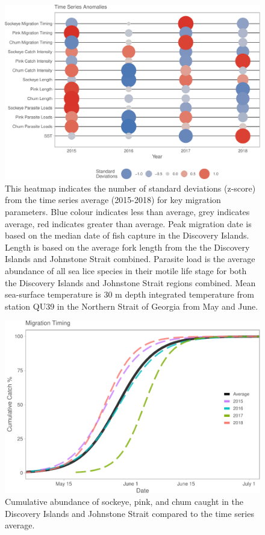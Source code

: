 \documentclass[fleqn,10pt]{wlpeerj} %
\begin{document}
\begin{figure}[H]
\includegraphics[width=0.95\linewidth]{Migration_Observations_Report_files/figure-latex/heatmap-1} \caption{This heatmap indicates the number of standard deviations (z-score) from the time series average (2015-2018) for key migration parameters. Blue colour indicates less than average, grey indicates average, red indicates greater than average. Peak migration date is based on the median date of fish capture in the Discovery Islands. Length is based on the average fork length from the the Discovery Islands and Johnstone Strait combined. Parasite load is the average abundance of all sea lice species in their motile life stage for both the Discovery Islands and Johnstone Strait regions combined. Mean sea-surface temperature is 30 m depth integrated temperature from station QU39 in the Northern Strait of Georgia from May and June.}\label{fig:heatmap}
\end{figure}

\begin{figure}[H]
\includegraphics[width=0.9\linewidth]{Migration_Observations_Report_files/figure-latex/mt-1} \caption{Cumulative abundance of sockeye, pink, and chum caught in the Discovery Islands and Johnstone Strait compared to the time series average.}\label{fig:mt}
\end{figure}
\end{document}
